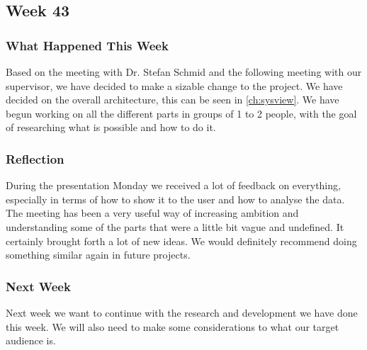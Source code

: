 \subsection{Week 43}\label{Week43}
\subsubsection{What Happened This Week}
Based on the meeting with Dr. Stefan Schmid and the following meeting with our
supervisor, we have decided to make a sizable change to the project. We have
decided on the overall architecture, this can be seen in \autoref{ch:sysview}.
We have begun working on all the different parts in groups of 1 to 2 people,
with the goal of researching what is possible and how to do it.



\subsubsection{Reflection}
During the presentation Monday we received a lot of feedback on everything,
especially in terms of how to show it to the user and how to analyse the data.
The meeting has been a very useful way of increasing ambition and understanding
some of the parts that were a little bit vague and undefined. It certainly
brought forth a lot of new ideas. We would definitely recommend doing something
similar again in future projects.

\subsubsection{Next Week}
Next week we want to continue with the research and development we have done
this week. We will also need to make some considerations to what our target
audience is.


